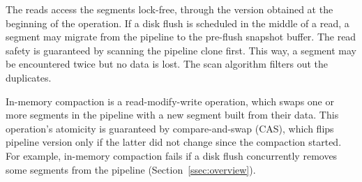 The reads access the segments lock-free, through the version obtained at the beginning of the operation. If a disk flush
is scheduled in the middle of a read, a segment may migrate from the pipeline to the pre-flush snapshot buffer. The read 
safety is guaranteed by scanning the pipeline clone first. This way, a segment may be encountered twice but no data is 
lost. The scan algorithm filters out the duplicates. 

In-memory compaction is a read-modify-write operation, which swaps one or more segments in the pipeline 
with a new segment built from their data. This operation's atomicity is guaranteed by compare-and-swap (CAS), 
which flips pipeline version only if the latter did not change since the compaction started.  For example, in-memory
compaction fails if a disk flush concurrently removes some segments from the pipeline (Section~\ref{ssec:overview}). 


